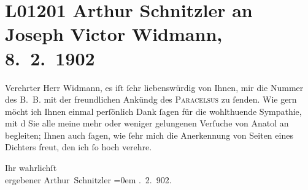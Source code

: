 

\section[Arthur Schnitzler an Joseph Victor Widmann, 8. 2. 1902]{L01201 Arthur Schnitzler an Joseph Victor Widmann, 8. 2. 1902}
\nopagebreak{}
\rehead{ }\normalsize\beginnumbering{}
\toendnotes[C]{\smallbreak\pagebreak[2]}
\pstart{}{\pb}Verehrter Herr Widmann,\pend\vspace{0.5em}
\pstart
            es iſt ſehr liebenswürdig von Ihnen, mir die Nummer des B. B. mit der freundlichen Ankündg des \textsc{Paracelsus} zu ſenden. Wie gern möcht ich Ihnen einmal perſönlich Dank ſagen für die {\pb}wohlthuende Sympathie, mit d Sie alle meine mehr oder weniger gelungenen Verſuche von Anatol an begleiten; Ihnen auch ſagen, wie ſehr
               mich die Anerkennung von Seiten eines Dichters freut, den ich ſo hoch verehre.\pend
           
\pstart
           Ihr wahrlichſt{\\[\baselineskip]}ergebener \spacefill\mbox{Arthur Schnitzler}\pend
           \leftskip=0em{}
. 2. 902.\pend
           \endnumbering{}  
      